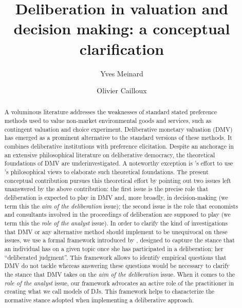\documentclass[version=3.21, pagesize, twoside=off, bibliography=totoc, DIV=calc, fontsize=12pt, a4paper, french, english]{scrartcl}
\newcommand{\institute}[1]{}
\newcommand{\keywords}[1]{}
\begin{document}
\title{Deliberation in valuation and decision making: a conceptual clarification}
\author{Yves Meinard \and Olivier Cailloux}
\institute{
	Yves Meinard
	\and
	Olivier Cailloux 
	\at 
	Université Paris-Dauphine, \\
	PSL Research University, \\
	CNRS, \\
	LAMSADE\\
	75016 PARIS, FRANCE\\
	\email{olivier.cailloux@dauphine.fr}
}
\makeatletter
\makeatother
\maketitle

\keywords{decision aid, justification, empirical validation, methodology} 

\begin{abstract}
A voluminous literature addresses the weaknesses of standard stated preference methods used to value non-market environmental goods and services, such as contingent valuation and choice experiment. 
Deliberative monetary valuation (DMV) has emerged as a prominent alternative to the standard versions of these methods. It combines deliberative institutions with preference elicitation. 
Despite an anchorage in an extensive philosophical literature on deliberative democracy, the theoretical foundations of DMV are underinvestigated.  
A noteworthy exception is \citet{bartkowski_beyond_2018}’s effort to use \citeauthor{sen_idea_2009}’s philosophical views to elaborate such theoretical foundations. 
The present conceptual contribution pursues this theoretical effort by pointing out two issues left unanswered by the above contribution: 
the first issue is the precise role that deliberation is expected to play in DMV and, more broadly, in decision-making (we term this the \emph{aim of the deliberation} issue); 
the second issue is the role that economists and consultants involved in the proceedings of deliberation are supposed to play (we term this the \emph{role of the analyst} issue). 
In order to clarify the kind of investigations that DMV or any alternative method should implement to be unequivocal on these issues, we use a formal framework introduced by \citet{cailloux_formal_2019}, designed to capture the stance that an individual has on a given topic once she has participated in a deliberation: her “deliberated judgment”. 
This framework allows to identify empirical questions that DMV do not tackle whereas answering these questions would be necessary to clarify the stance that DMV takes on the \emph{aim of the deliberation} issue. 
When it comes to the \emph{role of the analyst} issue, our framework advocates an active role of the practitioner in creating what we call models of \aclp{DJ}. 
This framework helps to characterize the normative stance adopted when implementing a deliberative approach.
\end{abstract}
\acresetall
\end{document}
